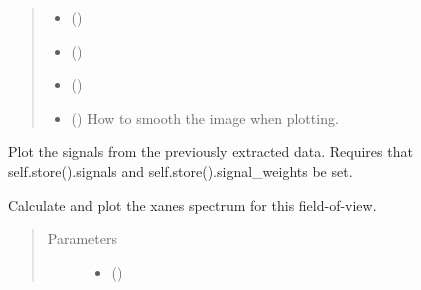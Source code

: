 \documentclass[letterpaper,10pt,english]{sphinxmanual}
\begin{document}
\begin{fulllineitems}
\begin{fulllineitems}
\begin{quote}
\begin{description}
\begin{itemize}
\item {} 
 (\sphinxstyleliteralemphasis{-}) \textendash{} 

\item {} 
\sphinxstyleliteralstrong{ (}\sphinxstyleliteralstrong{)} () \textendash{} 

\item {} 
 () \textendash{} 

\item {} 
 (\sphinxstyleliteralemphasis{-}) \textendash{} How to smooth the image when plotting.

\end{itemize}

\end{description}\end{quote}

\end{fulllineitems}


\begin{fulllineitems}
\label{\detokenize{xanespy:xanespy.xanes_frameset.XanesFrameset.plot_signals}}
Plot the signals from the previously extracted data. Requires that
self.store().signals and self.store().signal\_weights be set.

\end{fulllineitems}


\begin{fulllineitems}
\label{\detokenize{xanespy:xanespy.xanes_frameset.XanesFrameset.plot_xanes_spectrum}}
Calculate and plot the xanes spectrum for this field-of-view.
\begin{quote}\begin{description}
\item[{Parameters}] \leavevmode\begin{itemize}
\item {} 
 () \textendash{} 


\end{itemize}
\end{description}
\end{quote}
\end{fulllineitems}
\end{fulllineitems}
\end{document}
